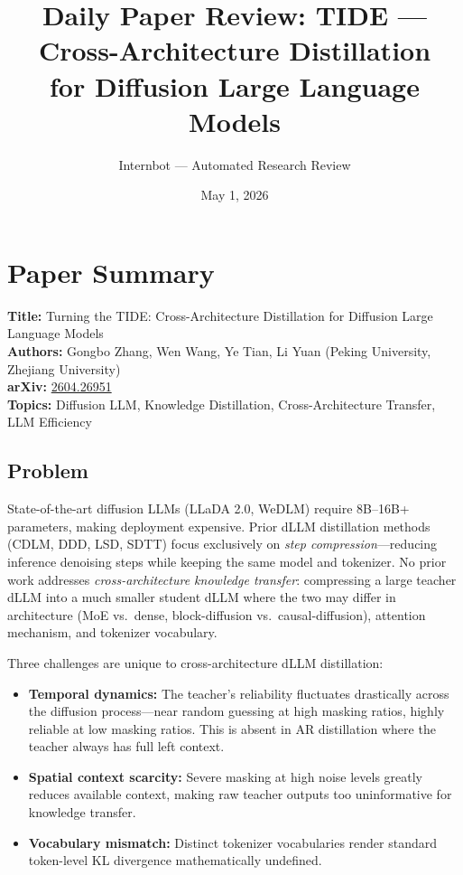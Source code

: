 \documentclass[11pt]{article}
\title{Daily Paper Review: TIDE --- Cross-Architecture Distillation\\for Diffusion Large Language Models}
\author{Internbot --- Automated Research Review}
\date{May 1, 2026}
\begin{document}
\maketitle

\section{Paper Summary}

\textbf{Title:} Turning the TIDE: Cross-Architecture Distillation for Diffusion Large Language Models \\
\textbf{Authors:} Gongbo Zhang, Wen Wang, Ye Tian, Li Yuan (Peking University, Zhejiang University) \\
\textbf{arXiv:} \href{https://arxiv.org/abs/2604.26951}{2604.26951} \\
\textbf{Topics:} Diffusion LLM, Knowledge Distillation, Cross-Architecture Transfer, LLM Efficiency

\subsection{Problem}

State-of-the-art diffusion LLMs (LLaDA 2.0, WeDLM) require 8B--16B+ parameters, making deployment expensive. Prior dLLM distillation methods (CDLM, DDD, LSD, SDTT) focus exclusively on \emph{step compression}---reducing inference denoising steps while keeping the same model and tokenizer. No prior work addresses \emph{cross-architecture knowledge transfer}: compressing a large teacher dLLM into a much smaller student dLLM where the two may differ in architecture (MoE vs.\ dense, block-diffusion vs.\ causal-diffusion), attention mechanism, and tokenizer vocabulary.

Three challenges are unique to cross-architecture dLLM distillation:

\begin{itemize}
    \item \textbf{Temporal dynamics:} The teacher's reliability fluctuates drastically across the diffusion process---near random guessing at high masking ratios, highly reliable at low masking ratios. This is absent in AR distillation where the teacher always has full left context.
    \item \textbf{Spatial context scarcity:} Severe masking at high noise levels greatly reduces available context, making raw teacher outputs too uninformative for knowledge transfer.
    \item \textbf{Vocabulary mismatch:} Distinct tokenizer vocabularies render standard token-level KL divergence mathematically undefined.
\end{itemize}
\end{document}
